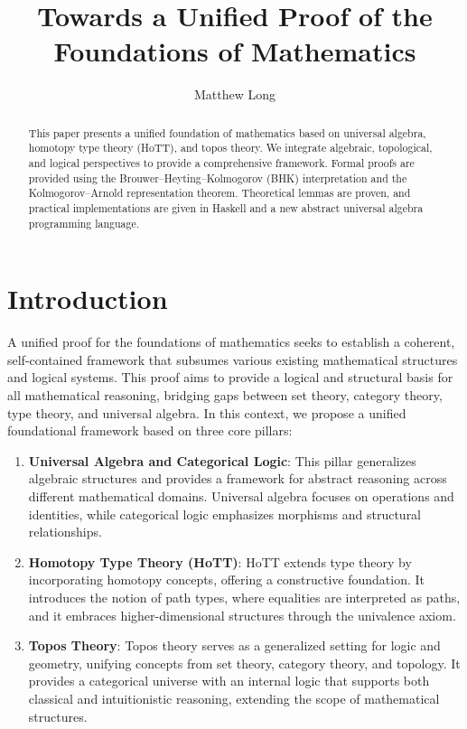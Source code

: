 \documentclass{article}
\title{Towards a Unified Proof of the Foundations of Mathematics}
\author{Matthew Long}
\date{}
\begin{document}
\maketitle

\begin{abstract}
This paper presents a unified foundation of mathematics based on universal algebra, homotopy type theory (HoTT), and topos theory. We integrate algebraic, topological, and logical perspectives to provide a comprehensive framework. Formal proofs are provided using the Brouwer–Heyting–Kolmogorov (BHK) interpretation and the Kolmogorov–Arnold representation theorem. Theoretical lemmas are proven, and practical implementations are given in Haskell and a new abstract universal algebra programming language.
\end{abstract}

\tableofcontents

\section{Introduction}

A unified proof for the foundations of mathematics seeks to establish a coherent, self-contained framework that subsumes various existing mathematical structures and logical systems. This proof aims to provide a logical and structural basis for all mathematical reasoning, bridging gaps between set theory, category theory, type theory, and universal algebra. In this context, we propose a unified foundational framework based on three core pillars:

\begin{enumerate}
    \item \textbf{Universal Algebra and Categorical Logic}: This pillar generalizes algebraic structures and provides a framework for abstract reasoning across different mathematical domains. Universal algebra focuses on operations and identities, while categorical logic emphasizes morphisms and structural relationships.

    \item \textbf{Homotopy Type Theory (HoTT)}: HoTT extends type theory by incorporating homotopy concepts, offering a constructive foundation. It introduces the notion of path types, where equalities are interpreted as paths, and it embraces higher-dimensional structures through the univalence axiom.

    \item \textbf{Topos Theory}: Topos theory serves as a generalized setting for logic and geometry, unifying concepts from set theory, category theory, and topology. It provides a categorical universe with an internal logic that supports both classical and intuitionistic reasoning, extending the scope of mathematical structures.

\end{enumerate}
\end{document}
